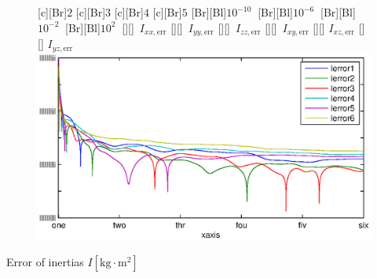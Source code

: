 \documentclass[student,noshadow]{ITRslides}
\newcommand{\scr}[1]{\mathrm{#1}}
\begin{document}
\begin{frame}
\begin{columns}
\begin{column}{0.5\textwidth}
\begin{figure}
				[c][Br]{$2$}
				[c][Br]{$3$}
				[c][Br]{$4$}
				[c][Br]{$5$}
				[Br][Bl]{$10^{-10}\  $}
				[Br][Bl]{$10^{-6}\  $}
				[Br][Bl]{$10^{-2}\  $}
				[Br][Bl]{$10^2\  $}
				[][]{\tiny \  $I_{xx,\scr{err}}$}
				[][]{\tiny \  $I_{yy,\scr{err}}$}
				[][]{\tiny \  $I_{zz,\scr{err}}$}
				[][]{\tiny \  $I_{xy,\scr{err}}$}
				[][]{\tiny \hspace{0.5cm} $I_{xz,\scr{err}}$}
				[][]{\tiny \hspace{0.5cm} $I_{yz,\scr{err}}$}
				\includegraphics[width=\textwidth]{fig/inertia_multi.eps}
				\label{fig:estim_inertia_multi}
			\end{figure}
			Error of inertias $I \left[\mathrm{kg} \cdot \mathrm{m}^2\right]$
		\end{column}
	\end{columns}
\end{frame}
\end{document}
